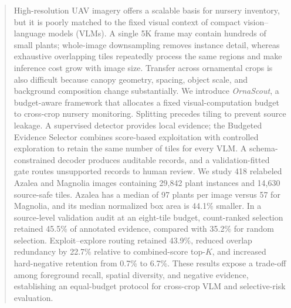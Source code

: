 \begin{abstract}
High-resolution UAV imagery offers a scalable basis for nursery inventory, but it is poorly matched to the fixed visual context of compact vision--language models (VLMs). A single 5K frame may contain hundreds of small plants; whole-image downsampling removes instance detail, whereas exhaustive overlapping tiles repeatedly process the same regions and make inference cost grow with image size. Transfer across ornamental crops is also difficult because canopy geometry, spacing, object scale, and background composition change substantially. We introduce \emph{OrnaScout}, a budget-aware framework that allocates a fixed visual-computation budget to cross-crop nursery monitoring. Splitting precedes tiling to prevent source leakage. A supervised detector provides local evidence; the Budgeted Evidence Selector combines score-based exploitation with controlled exploration to retain the same number of tiles for every VLM. A schema-constrained decoder produces auditable records, and a validation-fitted gate routes unsupported records to human review. We study 418 relabeled Azalea and Magnolia images containing 29,842 plant instances and 14,630 source-safe tiles. Azalea has a median of 97 plants per image versus 57 for Magnolia, and its median normalized box area is 44.1\% smaller. In a source-level validation audit at an eight-tile budget, count-ranked selection retained 45.5\% of annotated evidence, compared with 35.2\% for random selection. Exploit--explore routing retained 43.9\%, reduced overlap redundancy by 22.7\% relative to combined-score top-$K$, and increased hard-negative retention from 0.7\% to 6.7\%. These results expose a trade-off among foreground recall, spatial diversity, and negative evidence, establishing an equal-budget protocol for cross-crop VLM and selective-risk evaluation.
\end{abstract}
